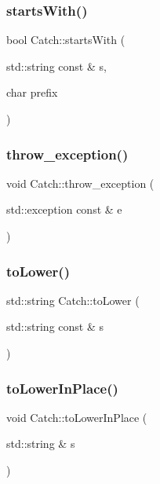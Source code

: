 \mbox{\label{namespace_catch_acad23751846ac23d0f379e34f5adebb1}} 
\subsubsection{startsWith()\hspace{0.1cm}{\footnotesize\ttfamily [2/2]}}
{\footnotesize\ttfamily bool Catch\+::starts\+With (\begin{DoxyParamCaption}\item[{std\+::string const \&}]{s,  }\item[{char}]{prefix }\end{DoxyParamCaption})}

\mbox{\label{namespace_catch_a3cbceeab9252d1b752f66a2826e92548}} 
\subsubsection{throw\_exception()}
{\footnotesize\ttfamily void Catch\+::throw\+\_\+exception (\begin{DoxyParamCaption}\item[{std\+::exception const \&}]{e }\end{DoxyParamCaption})}

\mbox{\label{namespace_catch_ac036a17412d318598ffda8e1fe7a1177}} 
\subsubsection{toLower()}
{\footnotesize\ttfamily std\+::string Catch\+::to\+Lower (\begin{DoxyParamCaption}\item[{std\+::string const \&}]{s }\end{DoxyParamCaption})}

\mbox{\label{namespace_catch_a0760dbe87d090a55a35414db57d272c4}} 
\subsubsection{toLowerInPlace()}
{\footnotesize\ttfamily void Catch\+::to\+Lower\+In\+Place (\begin{DoxyParamCaption}\item[{std\+::string \&}]{s }\end{DoxyParamCaption})}

